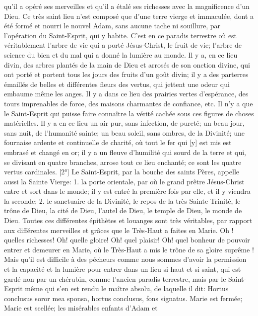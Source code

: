 qu'il a opéré ses merveilles et qu'il a étalé ses richesses avec la magnificence d'un Dieu. Ce très saint lieu n'est
composé que d'une terre vierge et immaculée, dont a été formé et nourri le nouvel Adam, sans aucune tache ni
souillure, par l'opération du Saint-Esprit, qui y habite. C'est en ce paradis terrestre où est véritablement l'arbre de
vie qui a porté Jésus-Christ, le fruit de vie; l'arbre de science du bien et du mal qui a donné la lumière au monde. Il
y a, en ce lieu divin, des arbres plantés de la main de Dieu et arrosés de son onction divine, qui ont porté et
portent tous les jours des fruits d'un goût divin; il y a des parterres émaillés de belles et différentes fleurs des
vertus, qui jettent une odeur qui embaume même les anges. Il y a dans ce lieu des prairies vertes d'espérance,
des tours imprenables de force, des maisons charmantes de confiance, etc. Il n'y a que le Saint-Esprit qui puisse
faire connaître la vérité cachée sous ces figures de choses matérielles. Il y a en ce lieu un air pur, sans infection,
de pureté; un beau jour, sans nuit, de l'humanité sainte; un beau soleil, sans ombres, de la Divinité; une fournaise
ardente et continuelle de charité, où tout le fer qui [y] est mis est embrasé et changé en or; il y a un fleuve
d'humilité qui sourd de la terre et qui, se divisant en quatre branches, arrose tout ce lieu enchanté; ce sont les
quatre vertus cardinales.
 [2°] Le Saint-Esprit, par la bouche des saints Pères, appelle aussi la Sainte Vierge: 1. la porte orientale, par
où le grand prêtre Jésus-Christ entre et sort dans le monde; il y est entré la première fois par elle, et il y viendra la
seconde; 2. le sanctuaire de la Divinité, le repos de la très Sainte Trinité, le trône de Dieu, la cité de Dieu, l'autel de
Dieu, le temple de Dieu, le monde de Dieu. Toutes ces différentes épithètes et louanges sont très véritables, par
rapport aux différentes merveilles et grâces que le Très-Haut a faites en Marie. Oh ! quelles richesses! Oh! quelle
gloire! Oh! quel plaisir! Oh! quel bonheur de pouvoir entrer et demeurer en Marie, où le Très-Haut a mis le trône de
sa gloire suprême !
 Mais qu'il est difficile à des pécheurs comme nous sommes d'avoir la permission et la capacité et la lumière
pour entrer dans un lieu si haut et si saint, qui est gardé non par un chérubin, comme l'ancien paradis terrestre,
mais par le Saint-Esprit même qui s'en est rendu le maître absolu, de laquelle il dit: Hortus conclusus soror mea
sponsa, hortus conclusus, fons signatus. Marie est fermée; Marie est scellée; les misérables enfants d'Adam et
